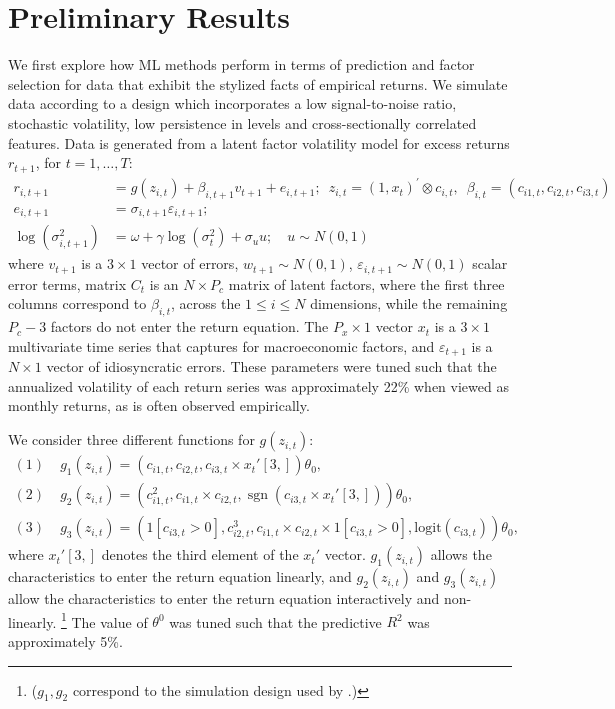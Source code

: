 \documentclass{article}
\begin{document}
\section{Preliminary Results}
We first explore how ML methods perform in terms of prediction and factor selection for data that exhibit the stylized facts of empirical returns. We simulate data according to a design which incorporates a low signal-to-noise ratio, stochastic volatility, low persistence in levels and cross-sectionally correlated features. Data is generated from a latent factor volatility model for excess returns $r_{t+1}$, for $t=1, \dots, T$:
\begin{align*}
r_{i, t+1} &= 
g\left(z_{i, t}\right) + \beta_{i,t+1}v_{t+1} + e_{i, t+1}; 
\enspace z_{i, t} = \left(1, x_{t}\right)^{\prime} \otimes c_{i, t}, 
\enspace \beta_{i, t} = \left(c_{i 1, t}, c_{i 2, t}, c_{i 3, t}\right) \\ 
e_{i, t+1} &= 
\sigma_{i, t+1} \varepsilon_{i, t+1}; \\
\operatorname{log} (\sigma^2_{i,t+1}) &= 
\omega + \gamma \operatorname{log} (\sigma^2_{t}) + \sigma_{u}u;
\quad u \sim N(0, 1)
\end{align*}
where $v_{t+1}$ is a $3\times 1$ vector of errors, $w_{t+1} \sim N(0, 1)$,  $\varepsilon_{i,t+1} \sim N(0, 1)$ scalar error terms, matrix $C_t$ is an $N\times P_c$ matrix of latent factors, where the first three columns correspond to $\beta_{i,t}$, across the $1\leq i\leq N$ dimensions, while the remaining $P_c-3$ factors do not enter the return equation. The $P_x\times1$ vector $x_t$ is a $3 \times 1$ multivariate time series that captures for macroeconomic factors, and $\varepsilon_{t+1}$ is a $N\times 1$ vector of idiosyncratic errors. These parameters were tuned such that the annualized volatility of each return series was approximately 22\% when viewed as monthly returns, as is often observed empirically.

We consider three different functions for $g(z_{i, t})$:
\begin{align*}
(1)\; & g_1 \left(z_{i, t}\right)=\left(c_{i 1, t}, c_{i 2, t}, c_{i 3, t} \times x_{t}'[3,]\right) \theta_{0}, \\
(2)\; & g_2 \left(z_{i, t}\right)=\left(c_{i 1, t}^{2}, c_{i 1, t} \times c_{i 2, t}, \operatorname{sgn}\left(c_{i 3, t} \times  x_{t}'[3,]\right)\right) \theta_{0}, \\
(3)\; & g_3 \left(z_{i, t}\right) = \left(1[c_{i3,t}>0],c_{i 2, t}^{3}, c_{i 1, t} \times c_{i 2, t}\times 1[c_{i3,t}>0], \text{logit}\left({c}_{i3, t} \right)\right) \theta_{0},
\end{align*}
where $x_{t}'[3,]$ denotes the third element of the $x_{t}'$ vector.
$g_1 \left(z_{i, t}\right)$ allows the characteristics to enter the return equation linearly, and $g_2 \left(z_{i, t}\right)$ and $g_3 \left(z_{i, t}\right)$ allow the characteristics to enter the return equation interactively and non-linearly. \footnote{($g_1, g_2$ correspond to the simulation design used by \cite{gu_empirical_2019}.)} The value of $\theta^0$ was tuned such that the predictive $R^2$ was approximately 5\%.
\end{document}
